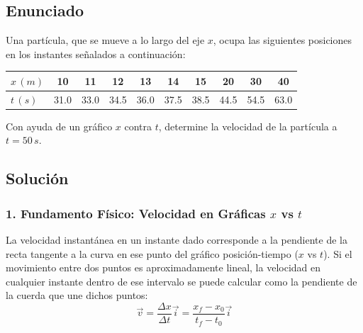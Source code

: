 \documentclass[12pt, a4paper]{article}
\begin{document}
\newpage

\subsection*{Enunciado}

Una partícula, que se mueve a lo largo del eje $x$, ocupa las siguientes posiciones en los instantes señalados a continuación:

\begin{center}
\begin{tabular}{|l|c|c|c|c|c|c|c|c|c|}
\hline
$x \, (\si{m})$ & 10 & 11 & 12 & 13 & 14 & 15 & 20 & 30 & 40 \\ \hline
$t \, (\si{s})$ & 31.0 & 33.0 & 34.5 & 36.0 & 37.5 & 38.5 & 44.5 & 54.5 & 63.0 \\ \hline
\end{tabular}
\end{center}

Con ayuda de un gráfico $x$ contra $t$, determine la velocidad de la partícula a $t = 50 \, \si{s}$.

\begin{center}
\end{center}

\subsection*{Solución}

\subsubsection*{1. Fundamento Físico: Velocidad en Gráficas $x$ vs $t$}

La velocidad instantánea en un instante dado corresponde a la pendiente de la recta tangente a la curva en ese punto del gráfico posición-tiempo ($x$ vs $t$).
Si el movimiento entre dos puntos es aproximadamente lineal, la velocidad en cualquier instante dentro de ese intervalo se puede calcular como la pendiente de la cuerda que une dichos puntos:
\begin{equation}
    \vec{v} = \frac{\Delta x}{\Delta t} \vec{i} = \frac{x_f - x_0}{t_f - t_0} \vec{i}
\end{equation}
\end{document}
